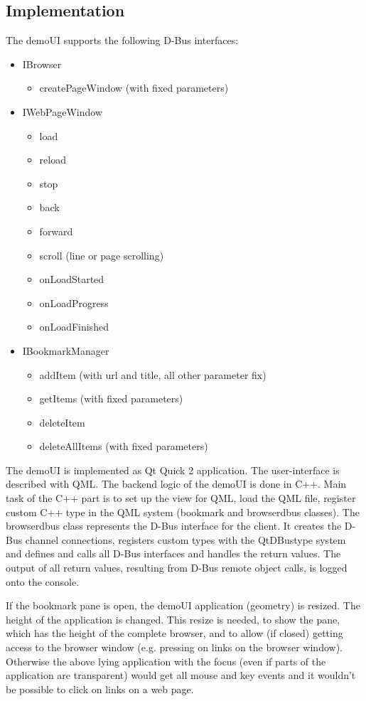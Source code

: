 \documentclass{pelagicore}
\begin{document}
\subsection{Implementation}
The demoUI supports the following D-Bus interfaces:
\begin{itemize}
    \item IBrowser
    \begin{itemize}
        \item createPageWindow (with fixed parameters)
    \end{itemize}
    \item IWebPageWindow
    \begin{itemize}
        \item load
        \item reload
        \item stop
        \item back
        \item forward
        \item scroll (line or page scrolling)
        \item onLoadStarted
        \item onLoadProgress
        \item onLoadFinished
    \end{itemize}
    \item IBookmarkManager
    \begin{itemize}
        \item addItem (with url and title, all other parameter fix)
        \item getItems (with fixed parameters)
        \item deleteItem
        \item deleteAllItems (with fixed parameters)
    \end{itemize}
\end{itemize}

The demoUI is implemented as Qt Quick 2 application. The user-interface is
described with QML. The backend logic of the demoUI is done in C++. Main task
of the C++ part is to set up the view for QML, load the QML file, register
custom C++ type in the QML system (bookmark and browserdbus classes). The
browserdbus class represents the D-Bus interface for the client. It creates the
D-Bus channel connections, registers custom types with the QtDBustype system
and defines and calls all D-Bus interfaces and handles the return values. The
output of all return values, resulting from D-Bus remote object calls, is logged
onto the console.

If the bookmark pane is open, the demoUI application (geometry) is resized. The
height of the application is changed. This resize is needed, to show the pane,
which has the height of the complete browser, and to allow (if closed) getting
access to the browser window (e.g. pressing on links on the browser window).
Otherwise the above lying application with the focus (even if parts of the
application are transparent) would get all mouse and key events and it wouldn’t
be possible to click on links on a web page.
\end{document}
